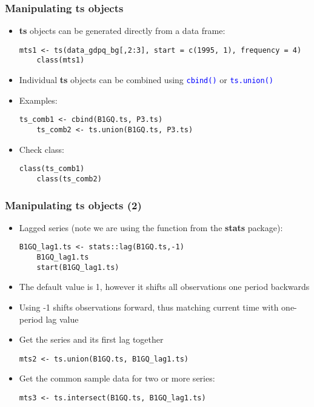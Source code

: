 \documentclass[10pt]{beamer}
\newcommand{\cc}[1]{\texttt{\textcolor{blue}{#1}}}
\theoremstyle{definition}
\begin{document}
\begin{frame}[fragile]
\frametitle{Manipulating \textbf{ts} objects}
\begin{itemize}
	\item \textbf{ts} objects can be generated directly from a data frame:
	
	\begin{lstlisting}[style = rstyle, breaklines]
	mts1 <- ts(data_gdpq_bg[,2:3], start = c(1995, 1), frequency = 4)
	class(mts1)
	\end{lstlisting}	

	\item Individual \textbf{ts} objects can be combined using \cc{cbind()} or \cc{ts.union()}

	\item  Examples:
	
	\begin{lstlisting}[style = rstyle, breaklines]
	ts_comb1 <- cbind(B1GQ.ts, P3.ts)
	ts_comb2 <- ts.union(B1GQ.ts, P3.ts)
	\end{lstlisting}
	
	\item Check class:
	\begin{lstlisting}[style = rstyle, breaklines]
	class(ts_comb1)
	class(ts_comb2)
	\end{lstlisting}
\end{itemize}
\end{frame}

\begin{frame}[fragile]
\frametitle{Manipulating \textbf{ts} objects (2)}
\begin{itemize}
	\item Lagged series (note we are using the function from the \textbf{stats} package):
	
	\begin{lstlisting}[style = rstyle, breaklines]
	B1GQ_lag1.ts <- stats::lag(B1GQ.ts,-1)
	B1GQ_lag1.ts
	start(B1GQ_lag1.ts)
	\end{lstlisting}
	
	\item The default value is 1, however it shifts all observations one period backwards
	
	\item Using -1 shifts observations forward, thus matching current time with one-period lag value

	\item Get the series and its first lag together
	\begin{lstlisting}[style = rstyle, breaklines]
	mts2 <- ts.union(B1GQ.ts, B1GQ_lag1.ts)
	\end{lstlisting}
	
	\item Get the common sample data for two or more series:
	
	\begin{lstlisting}[style = rstyle, breaklines]
	mts3 <- ts.intersect(B1GQ.ts, B1GQ_lag1.ts)
	\end{lstlisting}
\end{itemize}
\end{frame}
\end{document}
